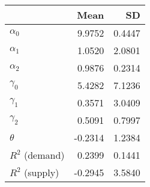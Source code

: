 
\begin{tabular}[t]{lrr}
\toprule
  & Mean & SD\\
\midrule
$\alpha_{0}$ & 9.9752 & 0.4447\\
$\alpha_{1}$ & 1.0520 & 2.0801\\
$\alpha_{2}$ & 0.9876 & 0.2314\\
$\gamma_{0}$ & 5.4282 & 7.1236\\
$\gamma_{1}$ & 0.3571 & 3.0409\\
$\gamma_{2}$ & 0.5091 & 0.7997\\
$\theta$ & -0.2314 & 1.2384\\
$R^{2}$ (demand) & 0.2399 & 0.1441\\
$R^{2}$ (supply) & -0.2945 & 3.5840\\
\bottomrule
\end{tabular}
